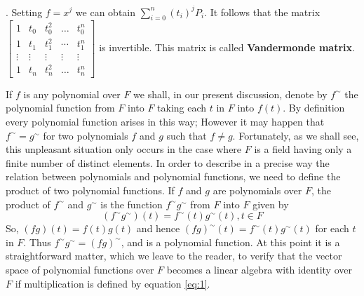 \documentclass[8pt]{beamer}
\newcommand{\tb}[1]{\textbf{#1}}
\begin{document}
\begin{frame}{.}
    Setting $f=x^j$ we can obtain $\sum_{i=0}^n (t_i)^j P_i$.
    It follows that the matrix $\begin{bmatrix}
    1 & t_0 & t_0^2 & \dots & t_0^n \\  1 & t_1 & t_1^2 & \cdots & t_1^n \\ \vdots & \vdots &\vdots & \vdots & \vdots \\ 1 & t_n & t_n^2 & \dots & t_n^n
    \end{bmatrix}$ is invertible.
    This matrix is called \tb{Vandermonde matrix}.

    \bigskip
    If $f$ is any polynomial over $F$ we shall, in our present discussion, denote by ${f}^\sim$ the polynomial function from $F$ into $F$ taking each $t$ in $F$ into $f(t)$.
    By definition every polynomial function arises in this way;
    However it may happen that ${f}^\sim = {g}^\sim$ for two polynomials $f$ and $g$ such that $f \neq g$.
    Fortunately, as we shall see, this unpleasant situation only occurs in the case where $F$ is a field having only a finite number of distinct elements.
    In order to describe in a precise way the relation between polynomials and polynomial functions, we need to define the product of two polynomial functions.
    If $f$ and $g$ are polynomials over $F$, the product of ${f}^\sim$ and ${g}^\sim$ is the function ${f}^\sim {g}^\sim$ from $F$ into $F$ given by 
    \begin{equation}
    \label{eq:1}
        ({f}^\sim{g}^\sim)(t) = {f}^\sim(t) {g}^\sim(t), t \in F
    \end{equation}
    So, $(fg)(t) = f(t)g(t)$ and hence ${(fg)}^\sim(t) = {f}^\sim(t) {g}^\sim(t)$ for each $t$ in $F$.
    Thus ${f}^\sim{g}^\sim = {(fg)}^\sim$, and is a polynomial function.
    At this point it is a straightforward matter, which we leave to the reader, to verify that the vector space of polynomial functions over $F$ becomes a linear algebra with identity over $F$ if multiplication is defined by equation \ref{eq:1}.
\end{frame}
\end{document}

